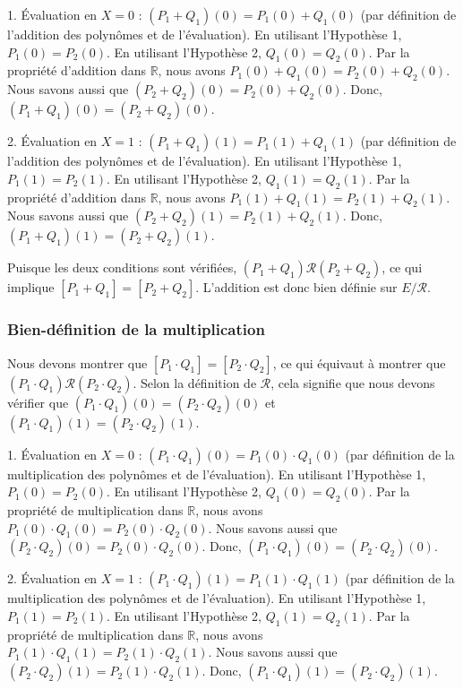 \documentclass{report}
\begin{document}
1.  Évaluation en $X=0$ :
    $(P_1+Q_1)(0) = P_1(0) + Q_1(0)$ (par définition de l'addition des polynômes et de l'évaluation).
    En utilisant l'Hypothèse 1, $P_1(0) = P_2(0)$.
    En utilisant l'Hypothèse 2, $Q_1(0) = Q_2(0)$.
    Par la propriété d'addition dans $\mathbb{R}$, nous avons $P_1(0) + Q_1(0) = P_2(0) + Q_2(0)$.
    Nous savons aussi que $(P_2+Q_2)(0) = P_2(0) + Q_2(0)$.
    Donc, $(P_1+Q_1)(0) = (P_2+Q_2)(0)$.

2.  Évaluation en $X=1$ :
    $(P_1+Q_1)(1) = P_1(1) + Q_1(1)$ (par définition de l'addition des polynômes et de l'évaluation).
    En utilisant l'Hypothèse 1, $P_1(1) = P_2(1)$.
    En utilisant l'Hypothèse 2, $Q_1(1) = Q_2(1)$.
    Par la propriété d'addition dans $\mathbb{R}$, nous avons $P_1(1) + Q_1(1) = P_2(1) + Q_2(1)$.
    Nous savons aussi que $(P_2+Q_2)(1) = P_2(1) + Q_2(1)$.
    Donc, $(P_1+Q_1)(1) = (P_2+Q_2)(1)$.

Puisque les deux conditions sont vérifiées, $(P_1+Q_1) \mathcal{R} (P_2+Q_2)$, ce qui implique $[P_1+Q_1] = [P_2+Q_2]$.
L'addition est donc bien définie sur $E/\mathcal{R}$.

\subsubsection*{Bien-définition de la multiplication}
Nous devons montrer que $[P_1 \cdot Q_1] = [P_2 \cdot Q_2]$, ce qui équivaut à montrer que $(P_1 \cdot Q_1) \mathcal{R} (P_2 \cdot Q_2)$.
Selon la définition de $\mathcal{R}$, cela signifie que nous devons vérifier que $(P_1 \cdot Q_1)(0) = (P_2 \cdot Q_2)(0)$ et $(P_1 \cdot Q_1)(1) = (P_2 \cdot Q_2)(1)$.

1.  Évaluation en $X=0$ :
    $(P_1 \cdot Q_1)(0) = P_1(0) \cdot Q_1(0)$ (par définition de la multiplication des polynômes et de l'évaluation).
    En utilisant l'Hypothèse 1, $P_1(0) = P_2(0)$.
    En utilisant l'Hypothèse 2, $Q_1(0) = Q_2(0)$.
    Par la propriété de multiplication dans $\mathbb{R}$, nous avons $P_1(0) \cdot Q_1(0) = P_2(0) \cdot Q_2(0)$.
    Nous savons aussi que $(P_2 \cdot Q_2)(0) = P_2(0) \cdot Q_2(0)$.
    Donc, $(P_1 \cdot Q_1)(0) = (P_2 \cdot Q_2)(0)$.

2.  Évaluation en $X=1$ :
    $(P_1 \cdot Q_1)(1) = P_1(1) \cdot Q_1(1)$ (par définition de la multiplication des polynômes et de l'évaluation).
    En utilisant l'Hypothèse 1, $P_1(1) = P_2(1)$.
    En utilisant l'Hypothèse 2, $Q_1(1) = Q_2(1)$.
    Par la propriété de multiplication dans $\mathbb{R}$, nous avons $P_1(1) \cdot Q_1(1) = P_2(1) \cdot Q_2(1)$.
    Nous savons aussi que $(P_2 \cdot Q_2)(1) = P_2(1) \cdot Q_2(1)$.
    Donc, $(P_1 \cdot Q_1)(1) = (P_2 \cdot Q_2)(1)$.
\end{document}
